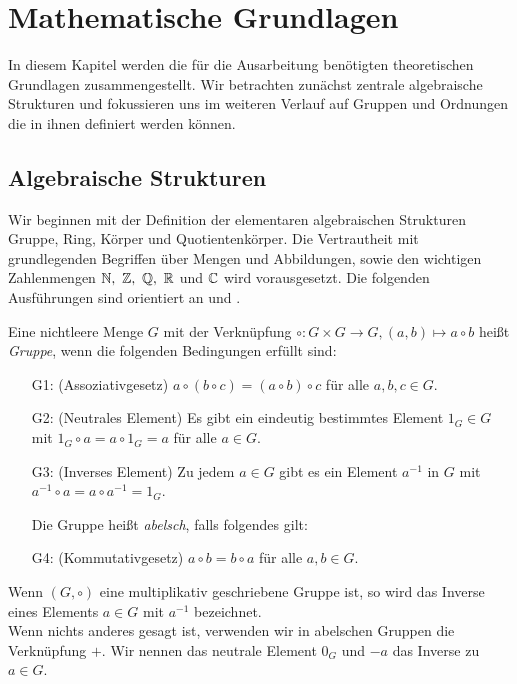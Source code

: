 \chapter{Mathematische Grundlagen}
In diesem Kapitel werden die für die Ausarbeitung benötigten theoretischen Grundlagen zusammengestellt. Wir betrachten zunächst zentrale algebraische Strukturen und fokussieren uns im weiteren Verlauf auf Gruppen und Ordnungen die in ihnen definiert werden können.
\section{Algebraische Strukturen}
Wir beginnen mit der Definition der elementaren algebraischen Strukturen Gruppe, Ring, Körper und Quotientenkörper. Die Vertrautheit mit grundlegenden Begriffen über Mengen und Abbildungen, sowie den wichtigen Zahlenmengen $\mathbb{N}, ~\mathbb{Z},~ \mathbb{Q},~ \mathbb{R}$ und $\mathbb{C}$ wird vorausgesetzt. Die folgenden Ausführungen sind orientiert an \cite{rainer08} und \cite{fischer08}.
%
\begin{defn}\label{Gruppe}
Eine nichtleere Menge $G$ mit der Verknüpfung $\circ \colon G \times G \rightarrow G, \left( a, b\right) \mapsto a \circ b$ heißt \textit{Gruppe}, wenn die folgenden Bedingungen erfüllt sind:
\begin{enumerate}
\item[G1: ] (Assoziativgesetz) $a\circ \left(b\circ c\right) = \left(a\circ b\right) \circ c$ für alle $a, b, c \in G$.
\item[G2: ] (Neutrales Element) Es gibt ein eindeutig bestimmtes Element $1_G \in G$ mit $1_G \circ a  = a \circ 1_G = a$ für alle $a \in G$.
\item[G3: ] (Inverses Element) Zu jedem $a \in G$ gibt es ein Element $a^{-1}$ in $G$ mit $a^{-1} \circ a = a \circ a^{-1} = 1_G$. \\
\item[] Die Gruppe heißt \textit{abelsch}, falls folgendes gilt: 
\item[G4: ] (Kommutativgesetz) $a \circ b = b \circ a$ für alle $a, b \in G$.  
\end{enumerate} 
\end{defn}
%
%
\begin{bem}
Wenn $\left(G, \circ\right)$ eine multiplikativ geschriebene Gruppe ist, so wird das Inverse eines Elements $a\in G$ mit $a^{-1}$ bezeichnet. \\
Wenn nichts anderes gesagt ist, verwenden wir in abelschen Gruppen die Verknüpfung $+$. Wir nennen das neutrale Element $0_G$ und $-a$ das Inverse zu $a\in G$. 
\end{bem}
